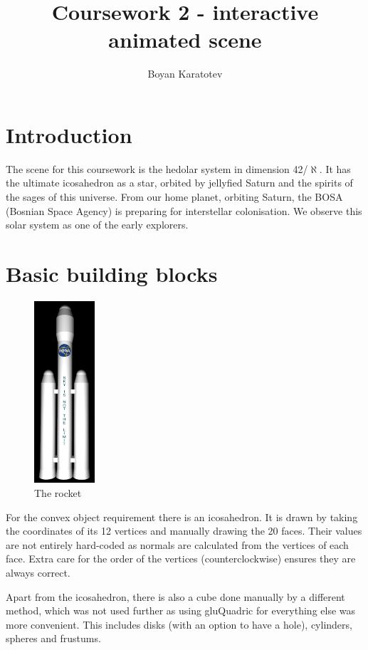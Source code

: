 \documentclass[10pt]{article}
\title{Coursework 2 - interactive animated scene}
\author{Boyan Karatotev}
\date{}
\begin{document}
    \maketitle

    \section{Introduction}

        The scene for this coursework is the hedolar system in dimension
        42/$\aleph$. It has the ultimate icosahedron as a star, orbited by
        jellyfied Saturn and the spirits of the sages of this universe. From
        our home planet, orbiting Saturn, the BOSA (Bosnian Space Agency) is
        preparing for interstellar colonisation. We observe this solar system
        as one of the early explorers.


    \section{Basic building blocks}
        \begin{figure}
            \caption{The rocket}
            \includegraphics[width=0.2\textwidth]{rocket}
        \end{figure}


        For the convex object requirement there is an icosahedron. It is drawn
        by taking the coordinates of its 12 vertices and manually drawing the
        20 faces. Their values are not entirely hard-coded as normals are
        calculated from the vertices of each face. Extra care for the order of
        the vertices (counterclockwise) ensures they are always correct.

        Apart from the icosahedron, there is also a cube done manually by a
        different method, which was not used further as using gluQuadric for
        everything else was more convenient. This includes disks (with an
        option to have a hole), cylinders, spheres and frustums.
\end{document}
